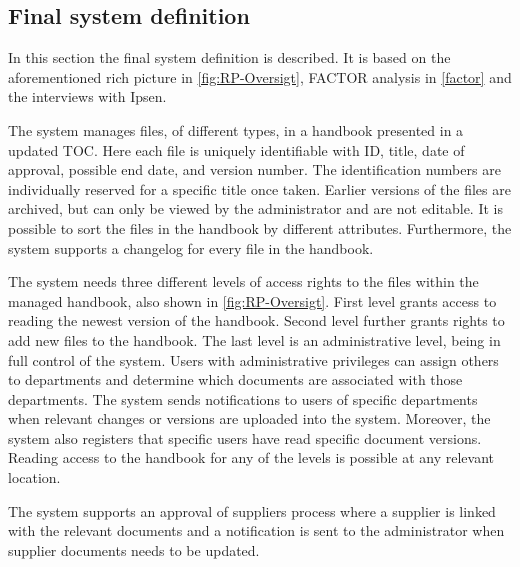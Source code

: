 \subsection{Final system definition}\label{sec:systemdefinition}
In this section the final system definition is described.
It is based on the aforementioned rich picture in \cref{fig:RP-Oversigt}, FACTOR analysis in \cref{factor} and the interviews with Ipsen.

The system manages files, of different types, in a handbook presented in a updated TOC.
Here each file is uniquely identifiable with ID, title, date of approval, possible end date, and version number.
The identification numbers are individually reserved for a specific title once taken.
Earlier versions of the files are archived, but can only be viewed by the administrator and are not editable.
It is possible to sort the files in the handbook by different attributes.
Furthermore, the system supports a changelog for every file in the handbook.

The system needs three different levels of access rights to the files within the managed handbook, also shown in \cref{fig:RP-Oversigt}.
First level grants access to reading the newest version of the handbook.
Second level further grants rights to add new files to the handbook.
The last level is an administrative level, being in full control of the system.
Users with administrative privileges can assign others to departments and determine which documents are associated with those departments.
The system sends notifications to users of specific departments when relevant changes or versions are uploaded into the system.
Moreover, the system also registers that specific users have read specific document versions.
Reading access to the handbook for any of the levels is possible at any relevant location.

The system supports an approval of suppliers process where a supplier is linked with the relevant documents and a notification is sent to the administrator when supplier documents needs to be updated.
